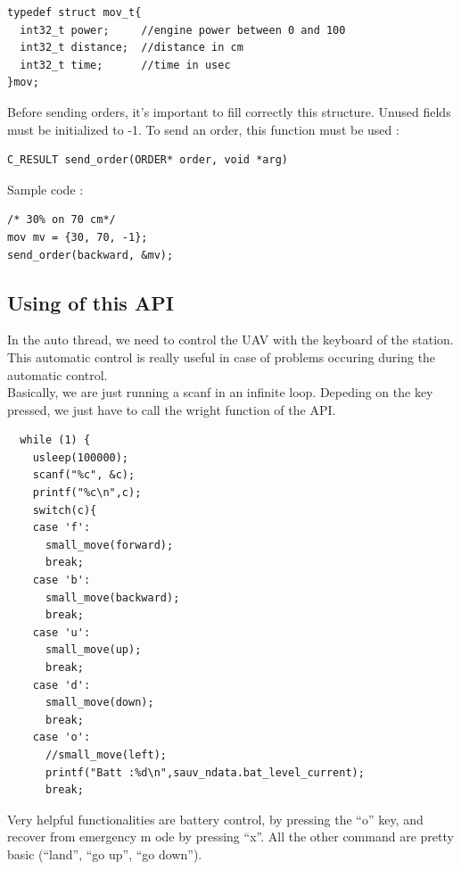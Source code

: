 \begin{lstlisting}
typedef struct mov_t{
  int32_t power;     //engine power between 0 and 100 
  int32_t distance;  //distance in cm
  int32_t time;      //time in usec
}mov;
\end{lstlisting}

Before sending orders, it's important to fill correctly this structure. Unused fields must be initialized to -1. To send an order, this function must be used :\\

\begin{lstlisting}
C_RESULT send_order(ORDER* order, void *arg)
\end{lstlisting}

Sample code :\\

\begin{lstlisting}
/* 30% on 70 cm*/
mov mv = {30, 70, -1};
send_order(backward, &mv);
\end{lstlisting}

\subsection{Using of this API}

In the auto thread, we need to control the UAV with the keyboard of the station. This automatic control is really useful in case of problems occuring during the automatic control.\\

Basically, we are just running a scanf in an infinite loop. Depeding on the key pressed, we just have to call the wright function of the API.\\

\begin{lstlisting}
  while (1) {
    usleep(100000);
    scanf("%c", &c);
    printf("%c\n",c);
    switch(c){
    case 'f':
      small_move(forward);
      break;
    case 'b':
      small_move(backward);
      break;
    case 'u':
      small_move(up);
      break;
    case 'd':
      small_move(down);
      break;
    case 'o':
      //small_move(left);
      printf("Batt :%d\n",sauv_ndata.bat_level_current);
      break;
\end{lstlisting}

Very helpful functionalities are battery control, by pressing the ``o'' key, and recover from emergency m
ode by pressing ``x''. All the other command are pretty basic (``land'', ``go up'', ``go down'').\\

